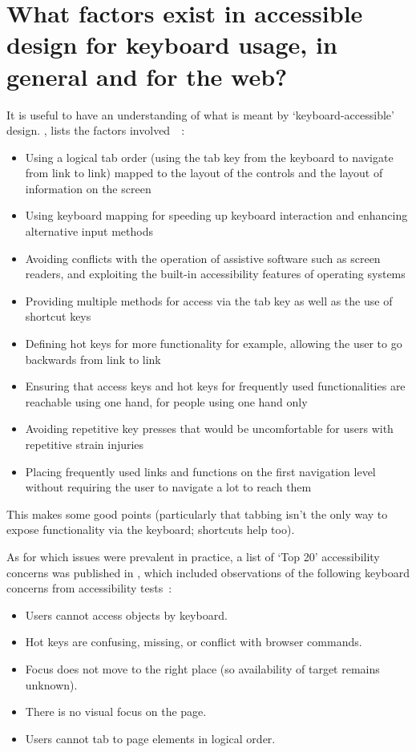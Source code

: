 \documentclass[11pt,openright,a4paper]{report}
\begin{document}
\section{What factors exist in accessible design for keyboard usage, in general and for the web?}
It is useful to have an understanding of what is meant by `keyboard-accessible' design. \citeauthor{deng}, \citeyear{deng} lists the factors involved~\cite{deng}~\parencite[as cited in][]{dellaporta2007web}:
\begin{itemize}
\item Using a logical tab order (using the tab key from the keyboard to navigate from link to link) mapped to the layout of the controls and the layout of information on the screen
\item Using keyboard mapping for speeding up keyboard interaction and enhancing alternative input methods
\item Avoiding conflicts with the operation of assistive software such as screen readers, and exploiting the built-in accessibility features of operating systems
\item Providing multiple methods for access via the tab key as well as the use of shortcut keys
\item Defining hot keys for more functionality for example, allowing the user to go backwards from link to link
\item Ensuring that access keys and hot keys for frequently used functionalities are reachable using one hand, for people using one hand only
\item Avoiding repetitive key presses that would be uncomfortable for users with repetitive strain injuries
\item Placing frequently used links and functions on the first navigation level without requiring the user to navigate a lot to reach them
\end{itemize}
This makes some good points (particularly that tabbing isn't the only way to expose functionality via the keyboard; shortcuts help too).

As for which issues were prevalent in practice, a list of `Top 20' accessibility concerns was published in \citeyear{hoffman2005emerging}, which included observations of the following keyboard concerns from accessibility tests~\cite{hoffman2005emerging}:
\begin{itemize}
\item Users cannot access objects by keyboard.
\item Hot keys are confusing, missing, or conflict with browser commands.
\item Focus does not move to the right place (so availability of target remains unknown).
\item There is no visual focus on the page.
\item Users cannot tab to page elements in logical order.
\end{itemize}
\end{document}
